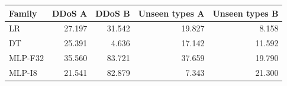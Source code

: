\begin{tabular}{lrrrr}
\toprule
Family & DDoS A & DDoS B & Unseen types A & Unseen types B \\
\midrule
LR & 27.197 & 31.542 & 19.827 & 8.158 \\
DT & 25.391 & 4.636 & 17.142 & 11.592 \\
MLP-F32 & 35.560 & 83.721 & 37.659 & 19.790 \\
MLP-I8 & 21.541 & 82.879 & 7.343 & 21.300 \\
\bottomrule
\end{tabular}

